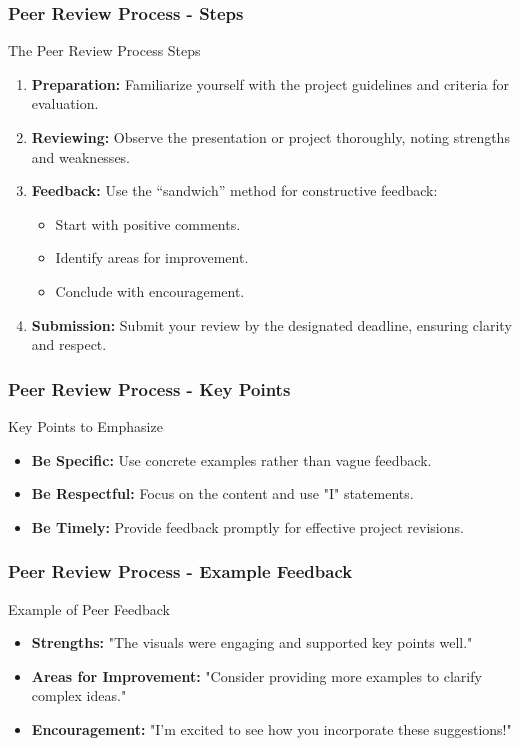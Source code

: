 \documentclass[aspectratio=169]{beamer}
\begin{document}
\begin{frame}[fragile]
    \frametitle{Peer Review Process - Steps}
    \begin{block}{The Peer Review Process Steps}
        \begin{enumerate}
            \item \textbf{Preparation:} Familiarize yourself with the project guidelines and criteria for evaluation.
            \item \textbf{Reviewing:} Observe the presentation or project thoroughly, noting strengths and weaknesses.
            \item \textbf{Feedback:} Use the “sandwich” method for constructive feedback:
                \begin{itemize}
                    \item Start with positive comments.
                    \item Identify areas for improvement.
                    \item Conclude with encouragement.
                \end{itemize}
            \item \textbf{Submission:} Submit your review by the designated deadline, ensuring clarity and respect.
        \end{enumerate}
    \end{block}
\end{frame}

\begin{frame}[fragile]
    \frametitle{Peer Review Process - Key Points}
    \begin{block}{Key Points to Emphasize}
        \begin{itemize}
            \item \textbf{Be Specific:} Use concrete examples rather than vague feedback.
            \item \textbf{Be Respectful:} Focus on the content and use "I" statements.
            \item \textbf{Be Timely:} Provide feedback promptly for effective project revisions.
        \end{itemize}
    \end{block}
\end{frame}

\begin{frame}[fragile]
    \frametitle{Peer Review Process - Example Feedback}
    \begin{block}{Example of Peer Feedback}
        \begin{itemize}
            \item \textbf{Strengths:} "The visuals were engaging and supported key points well."
            \item \textbf{Areas for Improvement:} "Consider providing more examples to clarify complex ideas."
            \item \textbf{Encouragement:} "I’m excited to see how you incorporate these suggestions!"
        \end{itemize}
    \end{block}
\end{frame}
\end{document}
